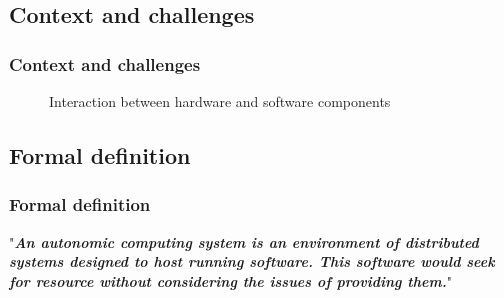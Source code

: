 \documentclass[11pt]{beamer}
\begin{document}
    \subsection{Context and challenges}
	\begin{frame}
		\frametitle{Context and challenges}
		\begin{center}
            \begin{figure}[!htb]\centering
                \begin{minipage}{1.0\textwidth}  \end{minipage}
                \caption{Interaction between hardware and software components}
                \label{hardware-software-interaction-chaos.png}
			\end{figure}
        \end{center}
    \end{frame}



    \subsection{Formal definition}
	\begin{frame}
		\frametitle{Formal definition}
		\begin{center}
				\item "\textbf{\textit{An autonomic computing system is an environment of distributed systems designed to host running software.   This software would seek for resource without considering the issues of providing them.}}"
        

		\end{center}
    \end{frame}
\end{document}
